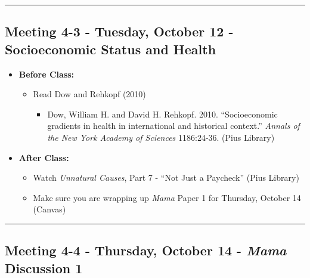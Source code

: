\documentclass[
]{book}
\providecommand{\tightlist}{%
  \setlength{\itemsep}{0pt}\setlength{\parskip}{0pt}}
\begin{document}
\begin{center}\rule{0.5\linewidth}{0.5pt}\end{center}

\hypertarget{meeting-4-3---tuesday-october-12---socioeconomic-status-and-health}{%
\subsection*{Meeting 4-3 - Tuesday, October 12 - Socioeconomic Status and Health}\label{meeting-4-3---tuesday-october-12---socioeconomic-status-and-health}}

\begin{itemize}
\tightlist
\item
  \textbf{Before Class:}

  \begin{itemize}
  \tightlist
  \item
    Read Dow and Rehkopf (2010)

    \begin{itemize}
    \tightlist
    \item
      Dow, William H. and David H. Rehkopf. 2010. ``Socioeconomic gradients in health in international and historical context.'' \emph{Annals of the New York Academy of Sciences} 1186:24-36. (Pius Library)
    \end{itemize}
  \end{itemize}
\item
  \textbf{After Class:}

  \begin{itemize}
  \tightlist
  \item
    Watch \emph{Unnatural Causes}, Part 7 - ``Not Just a Paycheck'' (Pius Library)
  \item
    Make sure you are wrapping up \emph{Mama} Paper 1 for Thursday, October 14 (Canvas)
  \end{itemize}
\end{itemize}

\begin{center}\rule{0.5\linewidth}{0.5pt}\end{center}

\hypertarget{meeting-4-4---thursday-october-14---mama-discussion-1}{%
\subsection*{\texorpdfstring{Meeting 4-4 - Thursday, October 14 - \emph{Mama} Discussion 1}{Meeting 4-4 - Thursday, October 14 - Mama Discussion 1}}\label{meeting-4-4---thursday-october-14---mama-discussion-1}}
\end{document}

